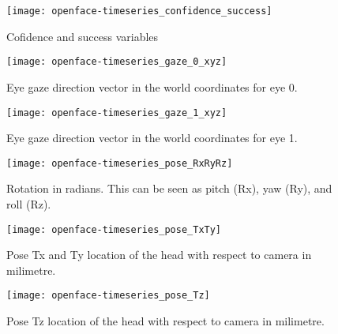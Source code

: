 \documentclass[a4paper,12pt]{article}
\begin{document}




\begin{figure}
\centering
\texttt{[image: openface-timeseries\_confidence\_success]}
\caption{Cofidence and success variables}
\end{figure}

\begin{figure}
\centering
\texttt{[image: openface-timeseries\_gaze\_0\_xyz]}
\caption{Eye gaze direction vector in the world coordinates for eye 0.}
\end{figure}

\begin{figure}
\centering
\texttt{[image: openface-timeseries\_gaze\_1\_xyz]}
\caption{Eye gaze direction vector in the world coordinates for eye 1.}
\end{figure}

\begin{figure}
\centering
\texttt{[image: openface-timeseries\_pose\_RxRyRz]}
\caption{Rotation in radians. This can be seen as pitch (Rx), yaw (Ry), and roll (Rz).}
\end{figure}

\begin{figure}
\centering
\texttt{[image: openface-timeseries\_pose\_TxTy]}
\caption{Pose Tx and Ty location of the head with respect to camera in milimetre.}
\end{figure}

\begin{figure}
\centering
\texttt{[image: openface-timeseries\_pose\_Tz]}
\caption{Pose Tz location of the head with respect to camera in milimetre.}
\end{figure}


%
\end{document}
